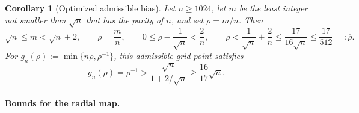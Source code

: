 \documentclass{article}
\newtheorem{corollary}[theorem]{Corollary}
\theoremstyle{definition}
\begin{document}
\begin{corollary}[Optimized admissible bias]
\label{cor:optimized-near-balanced-bias}
Let $n\ge1024$, let $m$ be the least integer not smaller than $\sqrt n$ that
has the parity of $n$, and set $\rho=m/n$.  Then
\begin{equation}
 \sqrt n\le m<\sqrt n+2,
 \qquad \rho=\frac mn,
 \qquad
 0\le\rho-\frac1{\sqrt n}<\frac2n,
 \qquad
 \rho<\frac1{\sqrt n}+\frac2n
 \le\frac{17}{16\sqrt n}
 \le\frac{17}{512}
 =:\overline\rho.
 \label{eq:m-rho}
\end{equation}
For $g_n(\rho):=\min\{n\rho,\rho^{-1}\}$, this admissible grid point satisfies
\begin{equation}
 g_n(\rho)=\rho^{-1}
 >\frac{\sqrt n}{1+2/\sqrt n}
 \ge\frac{16}{17}\sqrt n.
 \label{eq:appendix-discrete-envelope-value}
\end{equation}
\end{corollary}

\paragraph{Bounds for the radial map.}
\end{document}
